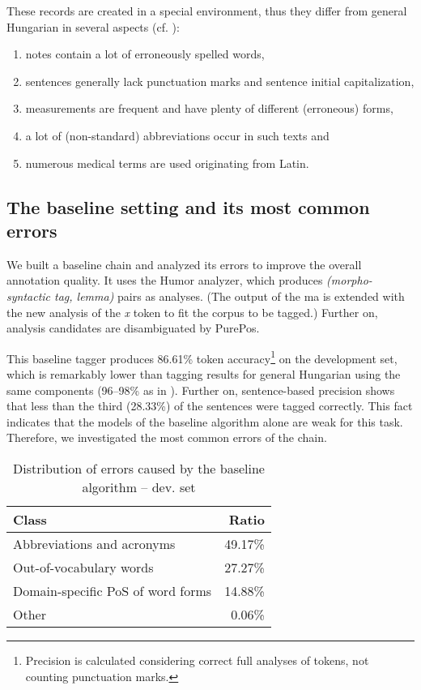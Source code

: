 These records are created in a special environment, thus they differ from general Hungarian in several aspects (cf. \cite{Orosz2013a,Siklosi2013b,Siklosi2012}):

\begin{enumerate} %
 \item notes contain a lot of erroneously spelled words,
 \item sentences generally lack punctuation marks and sentence initial capitalization, 
 \item measurements are frequent and have plenty of different (erroneous) forms,
 \item a lot of (non-standard) abbreviations occur in such texts and
 \item numerous medical terms are used originating from Latin.
\end{enumerate}

\subsection{The baseline setting and its most common errors}
\label{sec:baseline}

We built a baseline chain and analyzed its errors to improve the overall annotation quality.
It uses the Humor analyzer, which produces \emph{(morpho-syntactic tag, lemma)} pairs as analyses. 
(The output of the \acrshort{ma} is extended with the new analysis of the \textit{x} token to fit the corpus to be tagged.)
Further on, analysis candidates are disambiguated by PurePos. 

This baseline tagger produces 86.61\% token accuracy\footnote{Precision is calculated considering correct full analyses of tokens, not counting punctuation marks.} on the development set, which is remarkably lower than tagging results for general Hungarian using the same components (96--98\% as in \cite{Orosz2013b,zsibrata2013magyarlanc}). 
Further on, sentence-based precision shows that less than the third (28.33\%) of the sentences were tagged correctly. 
This fact indicates that the models of the baseline algorithm alone are weak for this task. 
Therefore, we investigated the most common errors of the chain.

\begin{table}[H]
\centering
\caption{Distribution of errors caused by the baseline algorithm -- dev. set}
\label{tab:error_types}
\begin{tabular}{ l r } 
\hline
Class & Ratio  \\
\hline
Abbreviations and acronyms & 49.17\% \\
Out-of-vocabulary words & 27.27\% \\
Domain-specific PoS of word forms & 14.88\% \\
Other & 0.06\% \\
\hline
\end{tabular}
\end{table}

